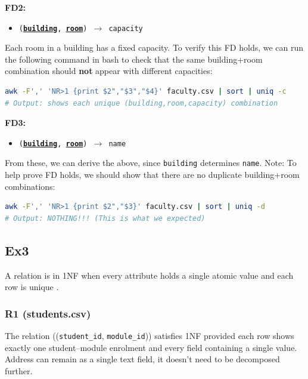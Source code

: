 \documentclass[12pt, a4paper]{report}
\begin{document}
\medskip
\noindent \textbf{FD2:}

\begin{itemize}
    \item{\texttt{(\textbf{\underline{building}}, \textbf{\underline{room}}) $\rightarrow$ capacity}}
\end{itemize}

Each room in a building has a fixed capacity. To verify this FD holds, we can run the following command in bash to check that the same building+room combination should \textbf{not} appear with different capacities:

\begin{lstlisting}[language=bash]
awk -F',' 'NR>1 {print $2","$3","$4}' faculty.csv | sort | uniq -c
# Output: shows each unique (building,room,capacity) combination
\end{lstlisting}

\medskip
\noindent \textbf{FD3:}

\begin{itemize}
    \item{\texttt{(\textbf{\underline{building}}, \textbf{\underline{room}}) $\rightarrow$ name}}
\end{itemize}

From these, we can derive the above, since \texttt{building} determines \texttt{name}. Note: To help prove FD holds, we should show that there are no duplicate building+room combinations:

\begin{lstlisting}[language=bash]
awk -F',' 'NR>1 {print $2","$3}' faculty.csv | sort | uniq -d
# Output: NOTHING!!! (This is what we expected)
\end{lstlisting}









\subsection{Ex3}

A relation is in 1NF when every attribute holds a single atomic value and each row is unique \cite{w3schools_sql}.

\subsubsection*{R1 (students.csv)}

The relation ((\texttt{student\_id}, \texttt{module\_id})) satisfies 1NF provided each row shows exactly one student--module enrolment and every field containing a single value. Address can remain as a single text field, it doesn't need to be decomposed further.
\end{document}
